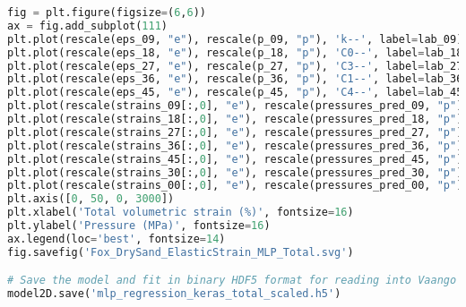 \begin{lstlisting}[language=Python]
fig = plt.figure(figsize=(6,6))
ax = fig.add_subplot(111)
plt.plot(rescale(eps_09, "e"), rescale(p_09, "p"), 'k--', label=lab_09)
plt.plot(rescale(eps_18, "e"), rescale(p_18, "p"), 'C0--', label=lab_18)
plt.plot(rescale(eps_27, "e"), rescale(p_27, "p"), 'C3--', label=lab_27)
plt.plot(rescale(eps_36, "e"), rescale(p_36, "p"), 'C1--', label=lab_36)
plt.plot(rescale(eps_45, "e"), rescale(p_45, "p"), 'C4--', label=lab_45)
plt.plot(rescale(strains_09[:,0], "e"), rescale(pressures_pred_09, "p"), 'k', linewidth=2, label='MLP')
plt.plot(rescale(strains_18[:,0], "e"), rescale(pressures_pred_18, "p"), 'C0', linewidth=2)
plt.plot(rescale(strains_27[:,0], "e"), rescale(pressures_pred_27, "p"), 'C3', linewidth=2)
plt.plot(rescale(strains_36[:,0], "e"), rescale(pressures_pred_36, "p"), 'C1', linewidth=2)
plt.plot(rescale(strains_45[:,0], "e"), rescale(pressures_pred_45, "p"), 'C4', linewidth=2)
plt.plot(rescale(strains_30[:,0], "e"), rescale(pressures_pred_30, "p"), 'C7', linewidth=2, label=lab_30)
plt.plot(rescale(strains_00[:,0], "e"), rescale(pressures_pred_00, "p"), 'C8', linewidth=2, label=lab_00)
plt.axis([0, 50, 0, 3000])
plt.xlabel('Total volumetric strain (%)', fontsize=16)
plt.ylabel('Pressure (MPa)', fontsize=16)
ax.legend(loc='best', fontsize=14)
fig.savefig('Fox_DrySand_ElasticStrain_MLP_Total.svg')

# Save the model and fit in binary HDF5 format for reading into Vaango
model2D.save('mlp_regression_keras_total_scaled.h5')
\end{lstlisting}
